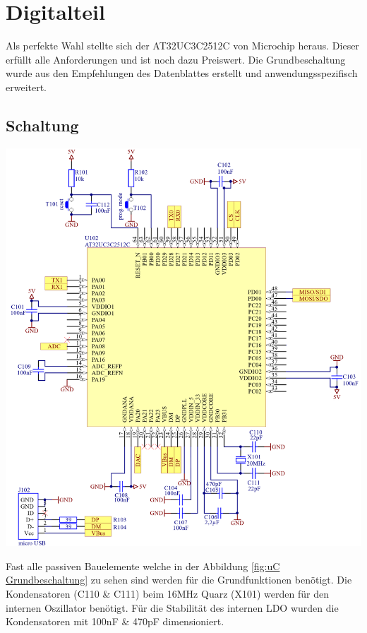 \documentclass[paper=a4, 12pt]{scrreprt}
\begin{document}
	\section{Digitalteil}
	Als perfekte Wahl stellte sich der AT32UC3C2512C von Microchip heraus. Dieser erfüllt alle Anforderungen und ist noch dazu Preiswert. Die Grundbeschaltung wurde aus den Empfehlungen des Datenblattes erstellt und anwendungsspezifisch erweitert.
		\subsection{Schaltung}
		\begin{adjustbox}{center,caption={Mikrocontroller Grundbeschaltung},label={fig:uC Grundbeschaltung},nofloat=figure,vspace=\bigskipamount}
			\includegraphics[width=\textwidth]{img/Grundbeschaltung_uC.PNG}
		\end{adjustbox}
	Fast alle passiven Bauelemente welche in der Abbildung \ref{fig:uC Grundbeschaltung} zu sehen sind werden für die Grundfunktionen benötigt. Die Kondensatoren (C110 \& C111) beim 16MHz Quarz (X101) werden für den internen Oszillator benötigt. Für die Stabilität des internen LDO wurden die Kondensatoren mit 100nF \& 470pF dimensioniert.
\end{document}

